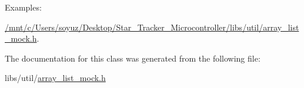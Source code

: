 \begin{Desc}
\item[Examples\+: ]\par
\hyperlink{_2mnt_2c_2Users_2soyuz_2Desktop_2Star_Tracker_Microcontroller_2libs_2util_2array_list_mock_8h-example}{/mnt/c/\+Users/soyuz/\+Desktop/\+Star\+\_\+\+Tracker\+\_\+\+Microcontroller/libs/util/array\+\_\+list\+\_\+mock.\+h}.\end{Desc}


The documentation for this class was generated from the following file\+:\begin{DoxyCompactItemize}
\item 
libs/util/\hyperlink{array__list__mock_8h}{array\+\_\+list\+\_\+mock.\+h}\end{DoxyCompactItemize}

